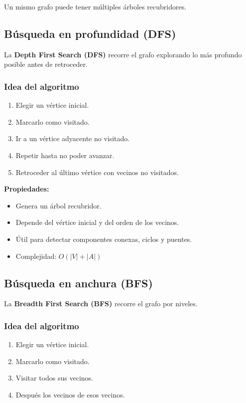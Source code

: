 \documentclass[12pt]{article}
\theoremstyle{plain}
\theoremstyle{definition}
\theoremstyle{remark}
\begin{document}
Un mismo grafo puede tener múltiples árboles recubridores.

\subsection*{Búsqueda en profundidad (DFS)}

La \textbf{Depth First Search (DFS)} recorre el grafo explorando lo más profundo posible antes de retroceder.

\subsubsection*{Idea del algoritmo}

\begin{enumerate}
    \item Elegir un vértice inicial.
    \item Marcarlo como visitado.
    \item Ir a un vértice adyacente no visitado.
    \item Repetir hasta no poder avanzar.
    \item Retroceder al último vértice con vecinos no visitados.
\end{enumerate}

\textbf{Propiedades:}

\begin{itemize}
    \item Genera un árbol recubridor.
    \item Depende del vértice inicial y del orden de los vecinos.
    \item Útil para detectar componentes conexas, ciclos y puentes.
    \item Complejidad: $O(|V| + |A|)$
\end{itemize}

\subsection*{Búsqueda en anchura (BFS)}

La \textbf{Breadth First Search (BFS)} recorre el grafo por niveles.

\subsubsection*{Idea del algoritmo}

\begin{enumerate}
    \item Elegir un vértice inicial.
    \item Marcarlo como visitado.
    \item Visitar todos sus vecinos.
    \item Después los vecinos de esos vecinos.
\end{enumerate}
\end{document}
